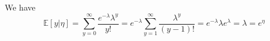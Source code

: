 \begin{answer}
We have
\[ \mathbb{E}[y|\eta] = \sum_{y=0}^{\infty}\frac{e^{-\lambda}\lambda^{y}}{y!}=e^{-\lambda}\sum_{y=1}^{\infty}\frac{\lambda^y}{(y-1)!}=e^{-\lambda}\lambda e^{\lambda}=\lambda = e^{\eta} \]
\end{answer}
